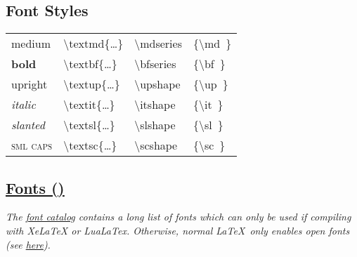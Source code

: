 \subsection*{Font Styles}
{\footnotesize \begin{tabular}{@{}l l l l}
    {\mdseries medium}                      &
    \textbackslash textmd\{\dots\}          &
    \textbackslash mdseries                 &
    \{\textbackslash md\ \}                 \\
    {\bfseries bold}                        &
    \textbackslash textbf\{\dots\}          &
    \textbackslash bfseries                 &
    \{\textbackslash bf\ \}                 \\
    {\upshape upright}                      &
    \textbackslash textup\{\dots\}          &
    \textbackslash upshape                  &
    \{\textbackslash up\ \}                 \\
    {\itshape italic}                       &
    \textbackslash textit\{\dots\}          &
    \textbackslash itshape                  &
    \{\textbackslash it\ \}                 \\
    {\slshape slanted}                      &
    \textbackslash textsl\{\dots\}          &
    \textbackslash slshape                  &
    \{\textbackslash sl\ \}                 \\
    {\scshape sml caps}                     &
    \textbackslash textsc\{\dots\}          &
    \textbackslash scshape                  &
    \{\textbackslash sc\ \}                 \\
\end{tabular}}


\subsection*{\href{https://www.overleaf.com/learn/latex/font_typefaces}{Fonts ()}}
\textit{The \href{https://tug.org/FontCatalogue/}{font catalog} contains a long list of fonts which can only be used if compiling with XeLaTeX or LuaLaTex. Otherwise, normal \LaTeX\ only enables open fonts (see \href{https://tex.stackexchange.com/questions/25249/how-do-i-use-a-particular-font-for-a-small-section-of-text-in-my-document}{here}).}\\
\\
\\
\\
\\
\\
\\
\\



